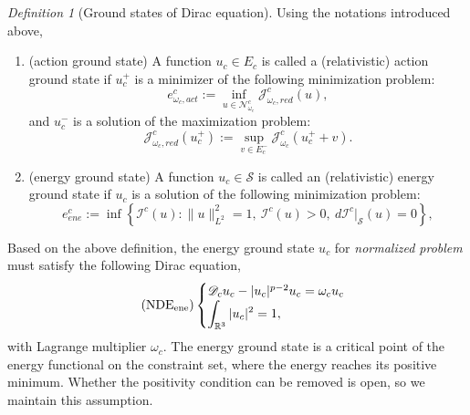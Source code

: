\documentclass{amsart}
\theoremstyle{plain}
\theoremstyle{definition}
\theoremstyle{remark}
\newtheorem{Def}{Definition}[section]
\numberwithin{equation}{section} \numberwithin{figure}{section}
\begin{document}
 \begin{Def}[Ground states of Dirac equation]Using the notations introduced above,
  \begin{enumerate}
  \item (action ground state) A function $u_c\in E_c$ is called a (relativistic) action ground state if $u_c^+$ is a minimizer of the following minimization problem:
  \[e_{\omega_c,act}^c:=\inf_{u\in\mathcal{N}_{\omega_c}^c}\mathcal{J}_{\omega_c,red}^c(u),\]
  and $u_c^-$ is a solution of the maximization
  problem:
  $$
\mathcal{J}_{\omega_c,red}^c(u_c^+):=
\sup_{v\in E_c^-}\mathcal{J}_{\omega_c}^c(u_c^++v).
$$
  \item (energy ground state) A function $u_c\in \mathcal{S}$ is 
  called an (relativistic) energy ground state if 
$u_c$ is a solution of the following minimization problem:
\begin{equation*}\label{new_a}
   e_{ene}^c:=\inf \left\{ \mathcal{I}^{c}(u): \|u\|^2_{L^2}=1,~\mathcal{I}^c(u)>0,  ~d\mathcal{I}^{c}|_{\mathcal{S}}(u)=0  \right\},
\end{equation*}
  \end{enumerate}
\end{Def}
Based on the above definition, the energy ground state $u_c$ for {\it normalized problem} must satisfy the following Dirac equation,
\begin{equation}\label{Dirac_e}\tag{$\mathrm{NDE}_{\mathrm{ene}}$}
    \begin{cases}
		 \mathscr{D}_cu_c- |u_c|^{p-2}u_c= \omega_cu_c
      \\
      \displaystyle\int_{\mathbb{R}^3}|u_c|^2 =1,
    \end{cases}
\end{equation}
with Lagrange multiplier $\omega_c$. 
 The energy ground state is a critical point of the energy functional on the constraint set, where the energy reaches its positive minimum. Whether the positivity condition can be removed is open, so we maintain this assumption.
\end{document}
